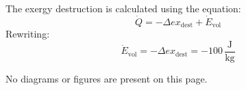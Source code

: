 The exergy destruction is calculated using the equation:  
\[
\dot{Q} = -\Delta ex_{\text{dest}} + \dot{E}_{\text{vol}}
\]  
Rewriting:  
\[
\dot{E}_{\text{vol}} = -\Delta ex_{\text{dest}} = -100 \, \frac{\text{J}}{\text{kg}}
\]  

No diagrams or figures are present on this page.